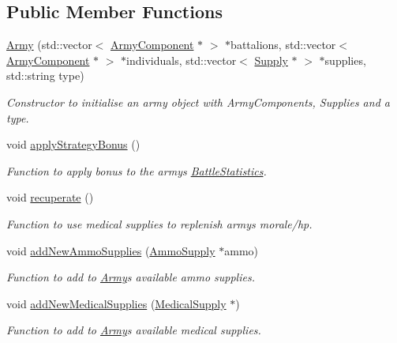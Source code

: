 \subsection*{Public Member Functions}
\begin{DoxyCompactItemize}
\item 
\mbox{\hyperlink{class_army_a24aef716a43cb562ed74dcad7ee0163b}{Army}} (std\+::vector$<$ \mbox{\hyperlink{class_army_component}{Army\+Component}} $\ast$ $>$ $\ast$battalions, std\+::vector$<$ \mbox{\hyperlink{class_army_component}{Army\+Component}} $\ast$ $>$ $\ast$individuals, std\+::vector$<$ \mbox{\hyperlink{class_supply}{Supply}} $\ast$ $>$ $\ast$supplies, std\+::string type)
\begin{DoxyCompactList}\small\item\em Constructor to initialise an army object with Army\+Components, Supplies and a type. \end{DoxyCompactList}\item 
void \mbox{\hyperlink{class_army_a58b4b12481451ff006f5ca4e0e941c4f}{apply\+Strategy\+Bonus}} ()
\begin{DoxyCompactList}\small\item\em Function to apply bonus to the army\textquotesingle{}s \mbox{\hyperlink{class_battle_statistics}{Battle\+Statistics}}. \end{DoxyCompactList}\item 
void \mbox{\hyperlink{class_army_aa8a3e8d9a987b5db2bc53dffd75a4596}{recuperate}} ()
\begin{DoxyCompactList}\small\item\em Function to use medical supplies to replenish army\textquotesingle{}s morale/hp. \end{DoxyCompactList}\item 
void \mbox{\hyperlink{class_army_a084c35aa0a977d9a9d2ee407c3927b52}{add\+New\+Ammo\+Supplies}} (\mbox{\hyperlink{class_ammo_supply}{Ammo\+Supply}} $\ast$ammo)
\begin{DoxyCompactList}\small\item\em Function to add to \mbox{\hyperlink{class_army}{Army}}\textquotesingle{}s available ammo supplies. \end{DoxyCompactList}\item 
void \mbox{\hyperlink{class_army_a0ca6fae9204652b57afae3cb4c44b349}{add\+New\+Medical\+Supplies}} (\mbox{\hyperlink{class_medical_supply}{Medical\+Supply}} $\ast$)
\begin{DoxyCompactList}\small\item\em Function to add to \mbox{\hyperlink{class_army}{Army}}\textquotesingle{}s available medical supplies. \end{DoxyCompactList}\item 

\end{DoxyCompactItemize}
